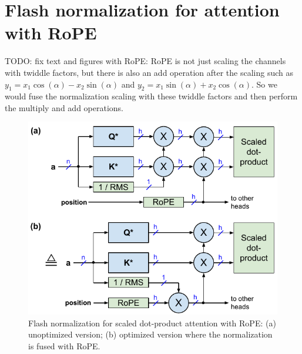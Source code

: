 \documentclass{article}
\numberwithin{equation}{section} %
\begin{document}
\section{Flash normalization for attention with RoPE}
TODO: fix text and figures with RoPE: RoPE is not just scaling the channels with twiddle factors, but there is also an add operation after the scaling such as $y_1 = x_1 \cos(\alpha) - x_2 \sin(\alpha)$ and $y_2 = x_1 \sin(\alpha) + x_2 \cos(\alpha)$. So we would fuse the normalization scaling with these twiddle factors and then perform the multiply and add operations.
\begin{figure}[h!] \centering
  \includegraphics[scale=0.9]{figs/flash_fig5.pdf}
  \caption{Flash normalization for scaled dot-product attention with RoPE: (a) unoptimized version; (b) optimized version where the normalization is fused with RoPE.}
\label{fig5} \end{figure}
\end{document}
